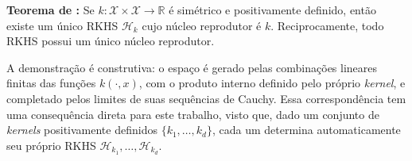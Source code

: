 \textbf{Teorema de \cite{Aronszajn1950}:} Se $k: \mathcal{X} \times \mathcal{X} \to \mathbb{R}$ é simétrico e positivamente definido, então existe um único RKHS $\mathcal{H}_k$ cujo núcleo reprodutor é $k$. Reciprocamente, todo RKHS possui um único núcleo reprodutor.

\noindent A demonstração é construtiva: o espaço é gerado pelas combinações lineares finitas das funções $k(\cdot, x)$, com o produto interno definido pelo próprio \textit{kernel}, e completado pelos limites de suas sequências de Cauchy. Essa correspondência tem uma consequência direta para este trabalho, visto que, dado um conjunto de \textit{kernels} positivamente definidos $\{k_1, \dots, k_d\}$, cada um determina automaticamente seu próprio RKHS $\mathcal{H}_{k_1}, \dots, \mathcal{H}_{k_d}$.
